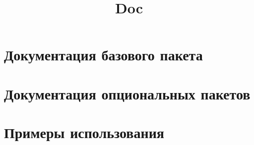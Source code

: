 \documentclass{../kpi.base}
\title{Doc}%
\begin{document}



\tableofcontents
\newpage
\pagestyle{myheadings}

\section{Документация базового пакета}

\section{Документация опциональных пакетов}





\section{Примеры использования}

\end{document}
